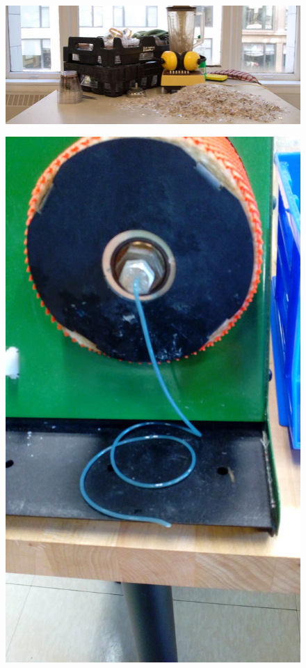 \begin{figure}[h!]
\centering
\includegraphics[width=\hsize]{art/shavings.jpg}
\caption{\label{fig:art_1}  }
\end{figure}

\begin{figure}[h!]
\centering
\includegraphics[width=0.5\hsize]{art/IMG_20160801_121017.jpg}
\caption{\label{fig:art_2}  }
\end{figure}

